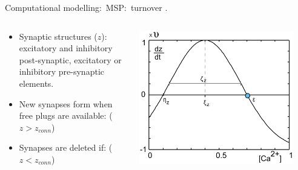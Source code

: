 \begin{frame}[c]{Computational modelling:\ MSP:\ turnover}
  .
  \begin{columns}
    \begin{column}{0.6\textwidth}
      \begin{itemize}
        \item Synaptic structures (\(z\)): excitatory \alert{and} inhibitory post-synaptic, excitatory \alert{or} inhibitory pre-synaptic elements.
        \item New synapses form when \alert{free} plugs are available: (\(z > z_{conn}\))
        \item Synapses are deleted if: (\(z < z_{conn}\))
      \end{itemize}
    \end{column}
    \begin{column}{0.5\textwidth}
      \centering
      \includegraphics[width=0.9\textwidth]{99_images/growth-curve-general.png}%
    \end{column}
  \end{columns}
\end{frame}
